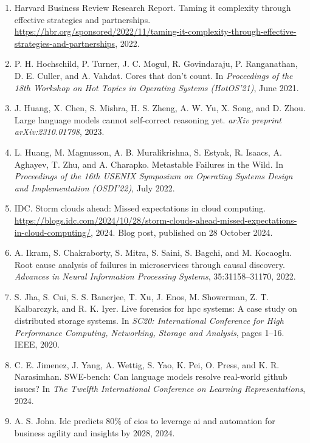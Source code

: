 \begin{enumerate}[leftmargin=2em,itemsep=2pt]
\item Harvard Business Review Research Report. Taming it complexity through effective strategies and partnerships. \url{https://hbr.org/sponsored/2022/11/taming-it-complexity-through-effective-strategies-and-partnerships}, 2022.

\item P. H. Hochschild, P. Turner, J. C. Mogul, R. Govindaraju, P. Ranganathan, D. E. Culler, and A. Vahdat. Cores that don't count. In \textit{Proceedings of the 18th Workshop on Hot Topics in Operating Systems (HotOS'21)}, June 2021.

\item J. Huang, X. Chen, S. Mishra, H. S. Zheng, A. W. Yu, X. Song, and D. Zhou. Large language models cannot self-correct reasoning yet. \textit{arXiv preprint arXiv:2310.01798}, 2023.

\item L. Huang, M. Magnusson, A. B. Muralikrishna, S. Estyak, R. Isaacs, A. Aghayev, T. Zhu, and A. Charapko. Metastable Failures in the Wild. In \textit{Proceedings of the 16th USENIX Symposium on Operating Systems Design and Implementation (OSDI'22)}, July 2022.

\item IDC. Storm clouds ahead: Missed expectations in cloud computing. \url{https://blogs.idc.com/2024/10/28/storm-clouds-ahead-missed-expectations-in-cloud-computing/}, 2024. Blog post, published on 28 October 2024.

\item A. Ikram, S. Chakraborty, S. Mitra, S. Saini, S. Bagchi, and M. Kocaoglu. Root cause analysis of failures in microservices through causal discovery. \textit{Advances in Neural Information Processing Systems}, 35:31158--31170, 2022.

\item S. Jha, S. Cui, S. S. Banerjee, T. Xu, J. Enos, M. Showerman, Z. T. Kalbarczyk, and R. K. Iyer. Live forensics for hpc systems: A case study on distributed storage systems. In \textit{SC20: International Conference for High Performance Computing, Networking, Storage and Analysis}, pages 1--16. IEEE, 2020.

\item C. E. Jimenez, J. Yang, A. Wettig, S. Yao, K. Pei, O. Press, and K. R. Narasimhan. SWE-bench: Can language models resolve real-world github issues? In \textit{The Twelfth International Conference on Learning Representations}, 2024.

\item A. S. John. Idc predicts 80\% of cios to leverage ai and automation for business agility and insights by 2028, 2024.


\end{enumerate}
